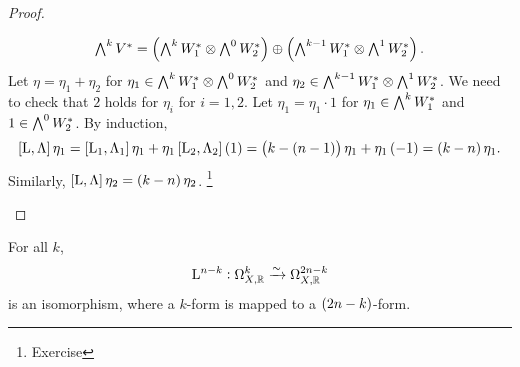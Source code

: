 \begin{proof}
\begin{enumerate}
\begin{itemize}[leftmargin=0.5in]
$$ \ext^kV^* = \br{\ext^kW_1^* \otimes \ext^0W_2^*} \oplus \br{\ext^{k - 1}W_1^* \otimes \ext^1W_2^*}. $$
Let $ \eta = \eta_1 + \eta_2 $ for $ \eta_1 \in \textstyle\bigwedge^kW_1^* \otimes \textstyle\bigwedge^0W_2^* $ and $ \eta_2 \in \textstyle\bigwedge^{k - 1}W_1^* \otimes \textstyle\bigwedge^1W_2^* $. We need to check that $ 2 $ holds for $ \eta_i $ for $ i = 1, 2 $. Let $ \eta_1 = \eta_1 \cdot 1 $ for $ \eta_1 \in \textstyle\bigwedge^kW_1^* $ and $ 1 \in \textstyle\bigwedge^0W_2^* $. By induction,
$$ \sbr{\L, \Lambda}\eta_1 = \sbr{\L_1, \Lambda_1}\eta_1 + \eta_1\sbr{\L_2, \Lambda_2}\br{1} = \br{k - \br{n - 1}}\eta_1 + \eta_1\br{-1} = \br{k - n}\eta_1. $$
Similarly, $ \sbr{\L, \Lambda}\eta_2 = \br{k - n}\eta_2 $. \footnote{Exercise}
\end{itemize}
\end{enumerate}
\end{proof}

\pagebreak

\begin{proposition}
\label{prop:6.42}
For all $ k $,
$$ \mathrm{L}^{n - k} : \Omega_{X, \mathbb{R}}^k \xrightarrow{\sim} \Omega_{X, \mathbb{R}}^{2n - k} $$
is an isomorphism, where a $ k $-form is mapped to a $ \br{2n - k} $-form.
\end{proposition}


